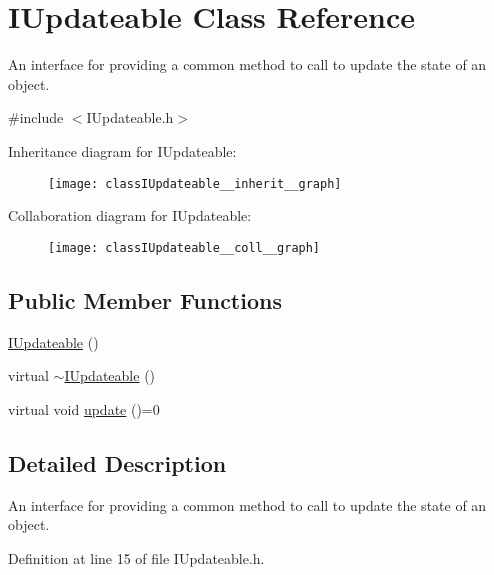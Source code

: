 \hypertarget{classIUpdateable}{\section{I\-Updateable Class Reference}
\label{classIUpdateable}
}


An interface for providing a common method to call to update the state of an object.  




{\ttfamily \#include $<$I\-Updateable.\-h$>$}



Inheritance diagram for I\-Updateable\-:\nopagebreak
\begin{figure}[H]
\begin{center}
\leavevmode
\texttt{[image: classIUpdateable\_\_inherit\_\_graph]}
\end{center}
\end{figure}


Collaboration diagram for I\-Updateable\-:\nopagebreak
\begin{figure}[H]
\begin{center}
\leavevmode
\texttt{[image: classIUpdateable\_\_coll\_\_graph]}
\end{center}
\end{figure}
\subsection*{Public Member Functions}
\begin{DoxyCompactItemize}
\item 
\hyperlink{classIUpdateable_a20e6a5ae876aefb90058ad2150ac9cbc}{I\-Updateable} ()
\item 
virtual \hyperlink{classIUpdateable_a92780ea45f4696a0c546c9d7932bd5d7}{$\sim$\-I\-Updateable} ()
\item 
virtual void \hyperlink{classIUpdateable_a46d178a1ecdab33bcaad25d9b38582a5}{update} ()=0
\end{DoxyCompactItemize}


\subsection{Detailed Description}
An interface for providing a common method to call to update the state of an object. 

Definition at line 15 of file I\-Updateable.\-h.



